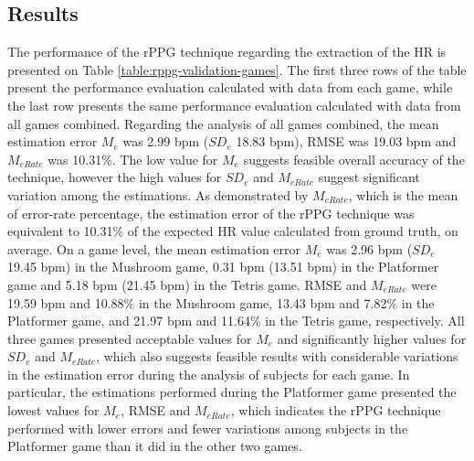 \begin{table}
\label{table:rppg-validation}
\end{table}

\subsection{Results}
The performance of the rPPG technique regarding the extraction of the HR is presented on Table \ref{table:rppg-validation-games}. The first three rows of the table present the performance evaluation calculated with data from each game, while the last row presents the same performance evaluation calculated with data from all games combined. Regarding the analysis of all games combined, the mean estimation error $M_e$ was 2.99 bpm ($SD_e$ 18.83 bpm), RMSE was 19.03 bpm and $M_{eRate}$ was 10.31\%. The low value for $M_e$ suggests feasible overall accuracy of the technique, however the high values for $SD_e$ and $M_{eRate}$ suggest significant variation among the estimations. As demonstrated by $M_{eRate}$, which is the mean of error-rate percentage, the estimation error of the rPPG technique was equivalent to 10.31\% of the expected HR value calculated from ground truth, on average. On a game level, the mean estimation error $M_e$ was 2.96 bpm ($SD_e$ 19.45 bpm) in the Mushroom game, 0.31 bpm (13.51 bpm) in the Platformer game and 5.18 bpm (21.45 bpm) in the Tetris game. RMSE and $M_{eRate}$ were 19.59 bpm and 10.88\% in the Mushroom game, 13.43 bpm and 7.82\% in the Platformer game, and 21.97 bpm and 11.64\% in the Tetris game, respectively. All three games presented acceptable values for $M_e$ and significantly higher values for $SD_e$ and $M_{eRate}$, which also suggests feasible results with considerable variations in the estimation error during the analysis of subjects for each game. In particular, the estimations performed during the Platformer game presented the lowest values for $M_e$, RMSE and $M_{eRate}$, which indicates the rPPG technique performed with lower errors and fewer variations among subjects in the Platformer game than it did in the other two games.

